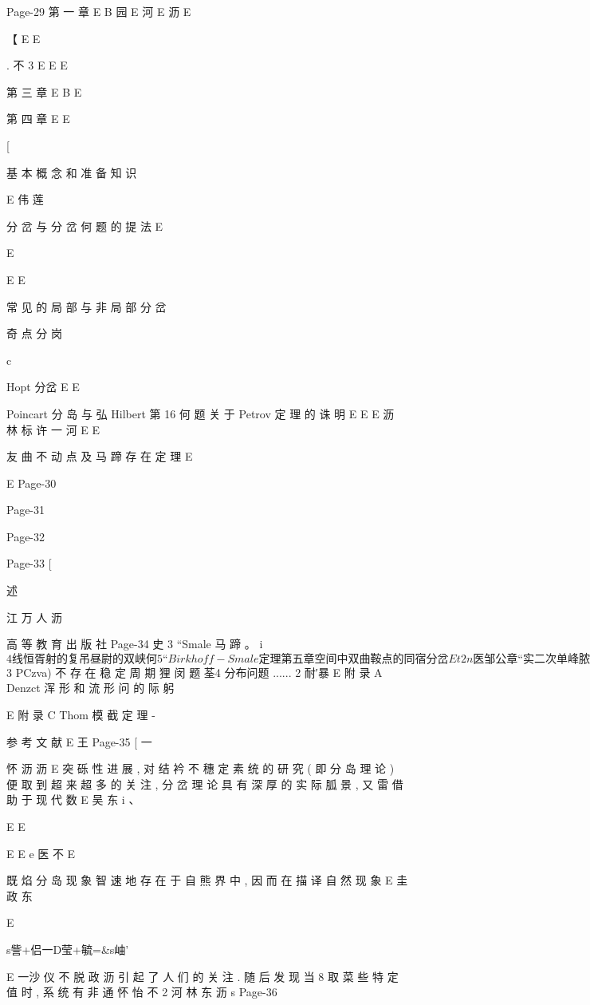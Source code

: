 
Page-29
第 一 章
E
B 园
E 河
E 沥
E

【
E
E

. 不 3
E
E
E

第 三 章
E
B
E

第 四 章
E
E

[

基 本 概 念 和 准 备 知 识

E 伟 莲

分 岔 与 分 岔 何 题 的 提 法
E

E

E
E

常 见 的 局 部 与 非 局 部 分 岔

奇 点 分 岗

c

Hopt 分岔 E
E

Poincart 分 岛 与 弘 Hilbert 第 16 何 题
关 于 Petrov 定 理 的 诛 明
E
E
E 沥 林 标 许 一
河
E
E

友 曲 不 动 点 及 马 蹄 存 在 定 理
E

E
Page-30

Page-31

Page-32

Page-33
[

述

江 万 人
沥

高 等 教 育 出 版 社
Page-34
史 3 “Smale 马 蹄 。 i
$ 4 线 恒 胥 射 的 复 吊 昼 尉 的 双 峡 何
5 “Birkhoff-Smale 定 理
第 五 章 空 间 中 双 曲 鞍 点 的 同 宿 分 岔
E t
2 n
医
邹 公 章 “ 实 二 次 单 峰 脓 射 旋 的 颂 引 子
E 河 玲
E 沥 沥 腾 3 浩 5
$ 3 PCzva) 不 存 在 稳 定 周 期 狸 闵 题
荃4 分布问题 ...... 2
耐′暴 E
附 录 A Denzct 浑 形 和 流 形 问 的 际 躬

E
附 录 C Thom 模 截 定 理 -

参 考 文 献
E 王
Page-35
[ 一

怀 沥 沥
E
突 砾 性 进 展 , 对 结 衿 不 穗 定 素 统 的 研 究 ( 即 分 岛 理 论 ) 便 取 到 超 来
超 多 的 关 注 , 分 岔 理 论 具 有 深 厚 的 实 际 胍 景 , 又 雷 借 助 于 现 代 数
E 吴 东
i 、

E
E

E
E e
医 不
E

既 焰 分 岛 现 象 智 速 地 存 在 于 自 熊 界 中 , 因 而 在 描 译 自 然 现 象
E 圭 政 东

E

s訾+侣一D莹+毓=&s岫'

E 一沙 仪 不 脱 政 沥
引 起 了 人 们 的 关 注 . 随 后 发 现 当 8 取 菜 些 特 定 值 时 , 系 统 有 非 通
怀 怡 不 2 河 林 东
沥
s
Page-36

